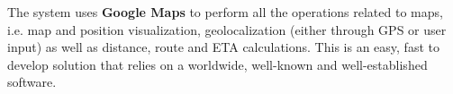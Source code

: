 The system uses \textbf{Google Maps} to perform all the operations related to maps, i.e. map and position visualization, geolocalization (either through GPS or user input) as well as distance, route and ETA calculations. This is an easy, fast to develop solution that relies on a worldwide, well-known and well-established software.